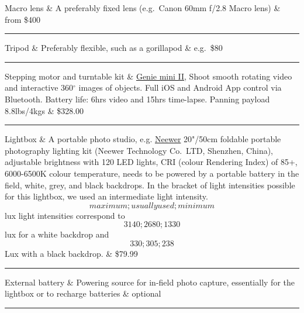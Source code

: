 \documentclass[
]{book}
\begin{document}
Macro lens \& A preferably fixed lens (e.g.~Canon 60mm f/2.8 Macro lens)
\& from \$400\\

\begin{center}\rule{0.5\linewidth}{0.5pt}\end{center}

Tripod \& Preferably flexible, such as a gorillapod \& e.g.~\$80\\

\begin{center}\rule{0.5\linewidth}{0.5pt}\end{center}

Stepping motor and turntable kit \& \href{https://www.bhphotovideo.com/c/product/1486043-REG/syrp_sykit_0043_genie_mini_ii_turntable.html/quick-compare}{Genie mini
II},
Shoot smooth rotating video and interactive 360\({^\circ}\) images of
objects. Full iOS and Android App control via Bluetooth. Battery life:
6hrs video and 15hrs time-lapse. Panning payload 8.8lbs/4kgs \& \$328.00\\

\begin{center}\rule{0.5\linewidth}{0.5pt}\end{center}

Lightbox \& A portable photo studio, e.g.
\href{https://neewer.com/products/lighting-studio-10094456?_pos=2\&_sid=bde9f6ddb\&_ss=r}{Neewer}
20"/50cm foldable portable photography lighting kit (Neewer Technology
Co.~LTD, Shenzhen, China), adjustable brightness with 120 LED lights,
CRI (colour Rendering Index) of 85+, 6000-6500K colour temperature,
needs to be powered by a portable battery in the field, white, grey, and
black backdrops. In the bracket of light intensities possible for this
lightbox, we used an intermediate light intensity. \[maximum;usually
used; minimum\] lux light intensities correspond to \[3140;2680;1330\]
lux for a white backdrop and \[330;305;238\] Lux with a black backdrop.
\& \$79.99\\

\begin{center}\rule{0.5\linewidth}{0.5pt}\end{center}

External battery \& Powering source for in-field photo capture,
essentially for the lightbox or to recharge batteries \& optional\\

\begin{center}\rule{0.5\linewidth}{0.5pt}\end{center}
\end{document}
